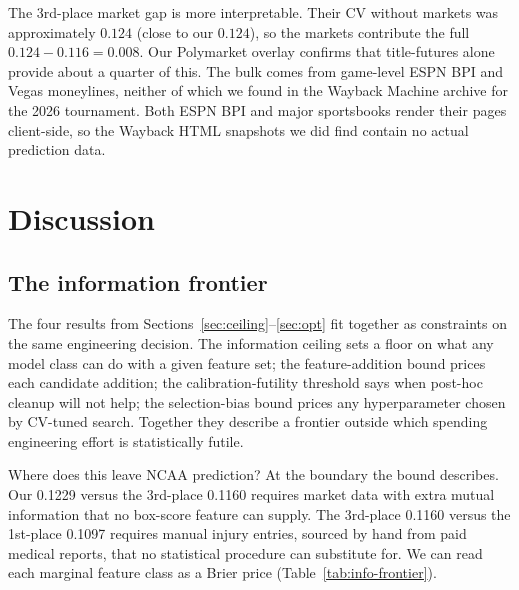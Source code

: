 \documentclass[11pt,a4paper]{article}
\theoremstyle{definition}
\begin{document}
The 3rd-place market gap is more interpretable. Their CV without markets was approximately $0.124$ (close to our $0.124$), so the markets contribute the full $0.124 - 0.116 = 0.008$. Our Polymarket overlay confirms that title-futures alone provide about a quarter of this. The bulk comes from game-level ESPN BPI and Vegas moneylines, neither of which we found in the Wayback Machine archive for the 2026 tournament. Both ESPN BPI and major sportsbooks render their pages client-side, so the Wayback HTML snapshots we did find contain no actual prediction data.

\section{Discussion}\label{sec:discussion}

\subsection{The information frontier}

The four results from Sections~\ref{sec:ceiling}--\ref{sec:opt} fit together as constraints on the same engineering decision. The information ceiling sets a floor on what any model class can do with a given feature set; the feature-addition bound prices each candidate addition; the calibration-futility threshold says when post-hoc cleanup will not help; the selection-bias bound prices any hyperparameter chosen by CV-tuned search. Together they describe a frontier outside which spending engineering effort is statistically futile.

Where does this leave NCAA prediction? At the boundary the bound describes. Our 0.1229 versus the 3rd-place 0.1160 requires market data with extra mutual information that no box-score feature can supply. The 3rd-place 0.1160 versus the 1st-place 0.1097 requires manual injury entries, sourced by hand from paid medical reports, that no statistical procedure can substitute for. We can read each marginal feature class as a Brier price (Table~\ref{tab:info-frontier}).
\end{document}
